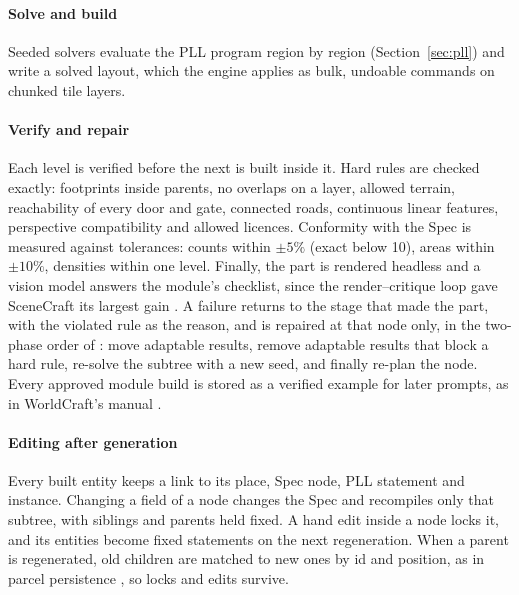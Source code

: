 \documentclass[conference]{IEEEtran}
\begin{document}
\paragraph{Solve and build} Seeded solvers evaluate the PLL program region by region
(Section~\ref{sec:pll}) and write a solved layout, which the engine applies as bulk,
undoable commands on chunked tile layers.

\paragraph{Verify and repair} Each level is verified before the next is built inside it.
Hard rules are checked exactly: footprints inside parents, no overlaps on a layer,
allowed terrain, reachability of every door and gate, connected roads, continuous linear
features, perspective compatibility and allowed licences. Conformity with the Spec is
measured against tolerances: counts within $\pm5\%$ (exact below 10), areas within
$\pm10\%$, densities within one level. Finally, the part is rendered headless and a
vision model answers the module's checklist, since the render--critique loop gave
SceneCraft its largest gain \cite{scenecraft}. A failure returns to the stage that made
the part, with the violated rule as the reason, and is repaired at that node only, in
the two-phase order of \cite{xu2025database}: move adaptable results, remove adaptable
results that block a hard rule, re-solve the subtree with a new seed, and finally
re-plan the node. Every approved module build is stored as a verified example for later
prompts, as in WorldCraft's manual \cite{worldcraft}.

\paragraph{Editing after generation} Every built entity keeps a link to its place, Spec
node, PLL statement and instance. Changing a field of a node changes the Spec and
recompiles only that subtree, with siblings and parents held fixed. A hand edit inside a
node locks it, and its entities become fixed statements on the next regeneration. When a
parent is regenerated, old children are matched to new ones by id and position, as in
parcel persistence \cite{vanegas2012}, so locks and edits survive.
\end{document}
